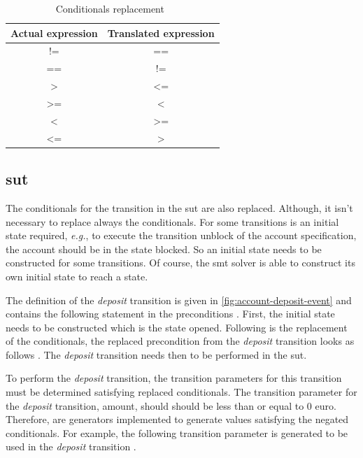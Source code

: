 \begin{table}[h!]
\centering
\begin{tabular}{cc}
\toprule
\textbf{Actual expression} & \textbf{Translated expression} \\ \midrule
!=                         & ==                             \\
==                         & !=                             \\
\textgreater               & \textless=                     \\
\textgreater=              & \textless                      \\
\textless                  & \textgreater=                  \\
\textless=                 & \textgreater                   \\ \bottomrule
\end{tabular}
\caption{Conditionals replacement~\cite{pitmutators}}\label{fig:table-replacement-conditions}
\end{table}
\FloatBarrier

\subsection{\gls{sut}}
The conditionals for the transition in the \gls{sut} are also replaced.
Although, it isn't necessary to replace always the conditionals. For some
transitions is an initial state required, \textit{e.g.}, to execute the transition unblock
of the account specification, the account should be in the state blocked. So an
initial state needs to be constructed for some transitions. Of course, the \gls{smt}
solver is able to construct its own initial state to reach a state.

The definition of the \textit{deposit} transition is given in
\autoref{fig:account-deposit-event} and contains the following statement in the
preconditions . First, the initial state needs to be
constructed which is the state opened. Following is the replacement of the conditionals, the
replaced precondition from the \textit{deposit} transition looks as follows
. The \textit{deposit} transition needs then to be
performed in the \gls{sut}.

To perform the \textit{deposit} transition, the transition parameters for this
transition must be determined satisfying replaced conditionals. The transition
parameter for the \textit{deposit} transition, amount, should should be less
than or equal to 0 euro. Therefore, are generators implemented to generate
values satisfying the negated conditionals. For example, the following
transition parameter is generated to be used in the \textit{deposit} transition
.

